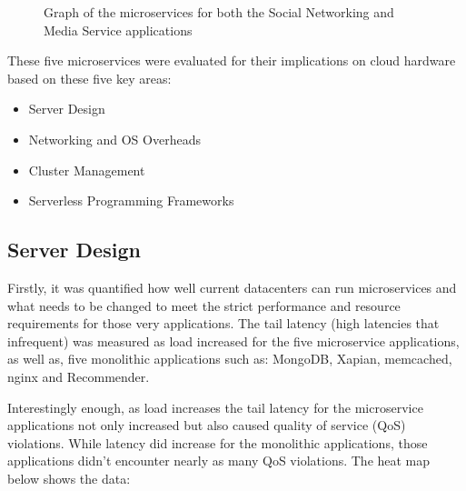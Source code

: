 \documentclass[12pt]{report}
\begin{document}
\begin{figure}[H]
    \centering
    \qquad
    \caption{Graph of the microservices for both the Social Networking and Media Service applications}
    \label{fig:graphs}
\end{figure}

These five microservices were evaluated for their implications on cloud hardware based on these five key areas:
\begin{itemize}
    \item Server Design
    \item Networking and OS Overheads
    \item Cluster Management
    \item Serverless Programming Frameworks
\end{itemize}

\subsection*{Server Design}
Firstly, it was quantified how well current datacenters can run microservices and what needs to be changed to meet the strict performance and resource requirements for those very applications. The tail latency (high latencies that infrequent) was measured as load increased for the five microservice applications, as well as, five monolithic applications such as: MongoDB, Xapian, memcached, nginx and Recommender. 

Interestingly enough, as load increases the tail latency for the microservice applications not only increased but also caused quality of service (QoS) violations. While latency did increase for the monolithic applications, those applications didn't encounter nearly as many QoS violations. The heat map below shows the data:
\end{document}

